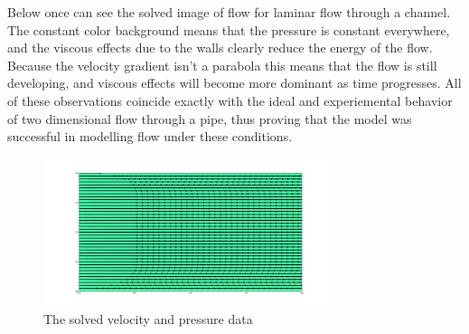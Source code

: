 \documentclass[12pt]{article}
\begin{document}
Below once can see the solved image of flow for laminar flow through a channel. The constant color background means 
that the pressure is constant everywhere, and the viscous effects due to the walls clearly reduce the energy of the 
flow. Because the velocity gradient isn't a parabola this means that the flow is still developing, and viscous effects 
will become more dominant as time progresses. All of these observations coincide exactly with the ideal and 
experiemental behavior of two dimensional flow through a pipe, thus proving that the model was successful in modelling 
flow under these conditions.
\begin{figure}[h]
\centering
\caption{The solved velocity and pressure data}
\includegraphics[width=0.75\textwidth]{solvedFlow2.png}
\end{figure}
\end{document}
